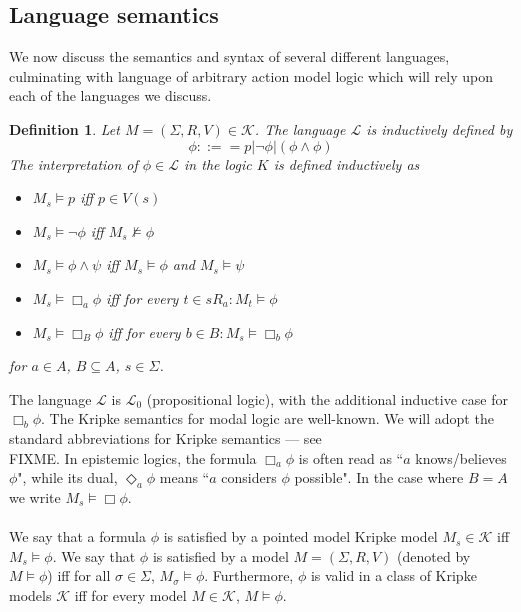 \documentclass[12pt, a4paper, titlepage]{scrartcl}
\newtheorem{defn}{Definition}[subsection]
\numberwithin{equation}{section}
\newcommand{\lang}{\mathcal{L}}
\newcommand{\langProp}{\lang_0}
\newcommand{\kripkeClass}{\mathcal{K}}
\newcommand{\FIXME}{{\bf FIXME}}
\begin{document}
\subsection{Language semantics}
We now discuss the semantics and syntax of several different languages, culminating with language of
arbitrary action model logic which will rely upon each of the languages we discuss.

\begin{defn} \label{modalLogic}
Let $M = (\Sigma, R, V) \in \kripkeClass$.
The language $\lang$ is inductively defined by
\[
	\phi ::== p | \neg \phi | (\phi \land \phi)
\]
The interpretation of $\phi \in \lang$ in the logic $K$ is defined inductively as
\begin{itemize}
	\item $M_s \models p$ iff $p \in V(s)$
	\item $M_s \models \neg \phi$ iff $M_s \not \models \phi$
	\item $M_s \models \phi \land \psi$ iff $M_s \models \phi$ and $M_s \models \psi$
	\item $M_s \models \Box_a \phi$ iff for every $t \in s R_a: M_t \models \phi$
	\item $M_s \models \Box_B \phi$ iff for every $b \in B : M_s \models \Box_b \phi$
\end{itemize}
for $a \in A$, $B \subseteq A$, $s \in \Sigma$.
\end{defn}
The language $\lang$ is $\langProp$ (propositional logic), with the additional inductive case for
$\Box_b \phi$.
The Kripke semantics for modal logic are well-known.
We will adopt the standard abbreviations for Kripke semantics --- see \\FIXME.
In epistemic logics, the formula $\Box_a \phi$ is often read as ``$a$ knows/believes $\phi$", while
its dual, $\Diamond_a \phi$ means ``$a$ considers $\phi$ possible".
In the case where $B = A$ we write $M_s \models \Box \phi$.\\
\\
We say that a formula $\phi$ is satisfied by a pointed model Kripke model $M_s \in \kripkeClass$ iff
$M_s \models \phi$.
We say that $\phi$ is satisfied by a model $M = (\Sigma, R, V)$ (denoted by $M \models \phi$) iff
for all $\sigma \in \Sigma$, $M_\sigma \models \phi$.
Furthermore, $\phi$ is valid in a class of Kripke models $\kripkeClass$ iff for every model $M \in
\kripkeClass$, $M \models \phi$.\\
\\
\end{document}
